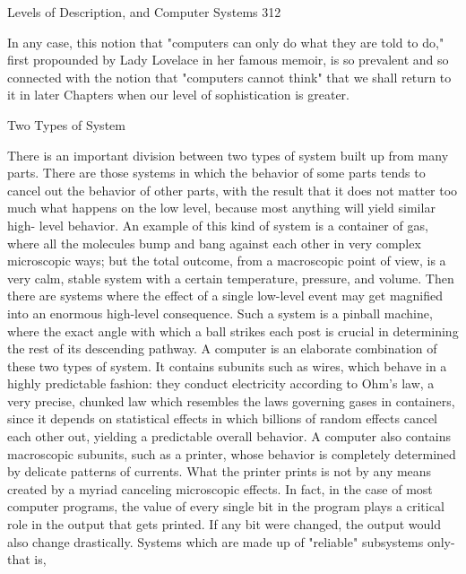 Levels of Description, and Computer Systems                                            312

               In any case, this notion that "computers can only do what they are told to
       do," first propounded by Lady Lovelace in her famous memoir, is so prevalent
       and so connected with the notion that "computers cannot think" that we shall
       return to it in later Chapters when our level of sophistication is greater.

                                      Two Types of System

       There is an important division between two types of system built up from many
       parts. There are those systems in which the behavior of some parts tends to cancel
       out the behavior of other parts, with the result that it does not matter too much
       what happens on the low level, because most anything will yield similar high-
       level behavior. An example of this kind of system is a container of gas, where all
       the molecules bump and bang against each other in very complex microscopic
       ways; but the total outcome, from a macroscopic point of view, is a very calm,
       stable system with a certain temperature, pressure, and volume. Then there are
       systems where the effect of a single low-level event may get magnified into an
       enormous high-level consequence. Such a system is a pinball machine, where the
       exact angle with which a ball strikes each post is crucial in determining the rest of
       its descending pathway.
                A computer is an elaborate combination of these two types of system. It
       contains subunits such as wires, which behave in a highly predictable fashion:
       they conduct electricity according to Ohm's law, a very precise, chunked law
       which resembles the laws governing gases in containers, since it depends on
       statistical effects in which billions of random effects cancel each other out,
       yielding a predictable overall behavior. A computer also contains macroscopic
       subunits, such as a printer, whose behavior is completely determined by delicate
       patterns of currents. What the printer prints is not by any means created by a
       myriad canceling microscopic effects. In fact, in the case of most computer
       programs, the value of every single bit in the program plays a critical role in the
       output that gets printed. If any bit were changed, the output would also change
       drastically.
                Systems which are made up of "reliable" subsystems only-that is,
